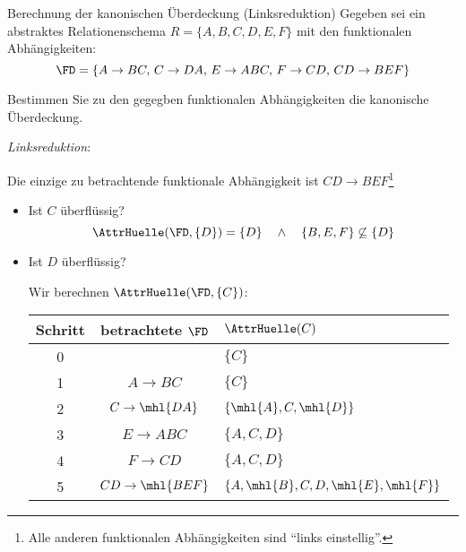 \begin{example}{Berechnung der kanonischen Überdeckung (Linksreduktion)}
    Gegeben sei ein abstraktes Relationenschema $R = \{ A, B, C, D, E, F \}$ mit den funktionalen Abhängigkeiten:
    \[
        \FD = \{
        A \to BC, \,
        C \to DA, \,
        E \to ABC, \,
        F \to CD, \,
        CD \to BEF
        \}
    \]

    Bestimmen Sie zu den gegegben funktionalen Abhängigkeiten die kanonische Überdeckung.

    \exampleseparator

    \emph{Linksreduktion}:

    Die einzige zu betrachtende funktionale Abhängigkeit ist $CD \to BEF$\footnote{Alle anderen funktionalen Abhängigkeiten sind \enquote{links einstellig}.}
    \begin{itemize}
        \item Ist $C$ überflüssig?
              \[
                  \AttrHuelle(\FD, \{D\}) = \{ D \} \quad \land \quad \{ B, E, F \} \not\subseteq \{ D \}
              \]
        \item Ist $D$ überflüssig?

              Wir berechnen $\AttrHuelle(\FD, \{ C \})$:

              \vspace{1em}
              \begin{center}
                  \begin{tabular}{|c|c|l|}
                      \hline
                      Schritt & betrachtete $\FD$  & $\AttrHuelle(C)$                           \\
                      \hline
                      0       &                    & $\{C\}$                                    \\
                      1       & $A \to BC$         & $\{C\}$                                    \\
                      2       & $C \to \mhl{DA}$   & $\{\mhl{A}, C, \mhl{D} \}$                 \\
                      3       & $E \to ABC$        & $\{ A, C, D \}$                            \\
                      4       & $F \to CD$         & $\{ A, C, D \}$                            \\
                      5       & $CD \to \mhl{BEF}$ & $\{ A, \mhl{B}, C, D, \mhl{E}, \mhl{F} \}$ \\
                      \hline
                  \end{tabular}
              \end{center}
              \vspace{1em}


\end{itemize}
\end{example}
